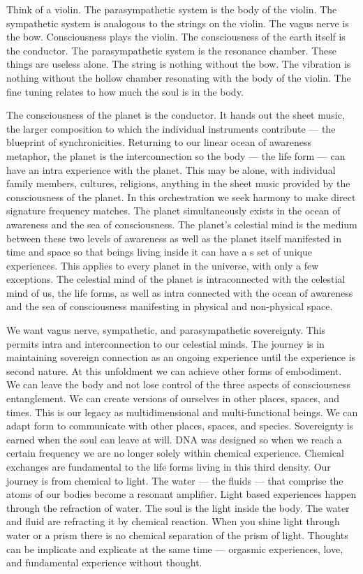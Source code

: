 Think of a violin. The parasympathetic system is the body of the violin.
The sympathetic system is analogous to the strings on the violin. The
vagus nerve is the bow. Consciousness plays the violin. The
consciousness of the earth itself is the conductor. The parasympathetic
system is the resonance chamber. These things are useless alone. The
string is nothing without the bow. The vibration is nothing without the
hollow chamber resonating with the body of the violin. The fine tuning
relates to how much the soul is in the body.

The consciousness of the planet is the conductor. It hands out the sheet
music, the larger composition to which the individual instruments
contribute --- the blueprint of synchronicities. Returning to our linear
ocean of awareness metaphor, the planet is the interconnection so the
body --- the life form --- can have an intra experience with the planet.
This may be alone, with individual family members, cultures, religions,
anything in the sheet music provided by the consciousness of the planet.
In this orchestration we seek harmony to make direct signature frequency
matches. The planet simultaneously exists in the ocean of awareness and
the sea of consciousness. The planet's celestial mind is the medium
between these two levels of awareness as well as the planet itself
manifested in time and space so that beings living inside it can have a
s set of unique experiences. This applies to every planet in the
universe, with only a few exceptions. The celestial mind of the planet
is intraconnected with the celestial mind of us, the life forms, as well
as intra connected with the ocean of awareness and the sea of
consciousness manifesting in physical and non-physical space.

We want vagus nerve, sympathetic, and parasympathetic sovereignty. This
permits intra and interconnection to our celestial minds. The journey is
in maintaining sovereign connection as an ongoing experience until the
experience is second nature. At this unfoldment we can achieve other
forms of embodiment. We can leave the body and not lose control of the
three aspects of consciousness entanglement. We can create versions of
ourselves in other places, spaces, and times. This is our legacy as
multidimensional and multi-functional beings. We can adapt form to
communicate with other places, spaces, and species. Sovereignty is
earned when the soul can leave at will. DNA was designed so when we
reach a certain frequency we are no longer solely within chemical
experience. Chemical exchanges are fundamental to the life forms living
in this third density. Our journey is from chemical to light. The water
--- the fluids --- that comprise the atoms of our bodies become a
resonant amplifier. Light based experiences happen through the
refraction of water. The soul is the light inside the body. The water
and fluid are refracting it by chemical reaction. When you shine light
through water or a prism there is no chemical separation of the prism of
light. Thoughts can be implicate and explicate at the same time ---
orgasmic experiences, love, and fundamental experience without thought.

